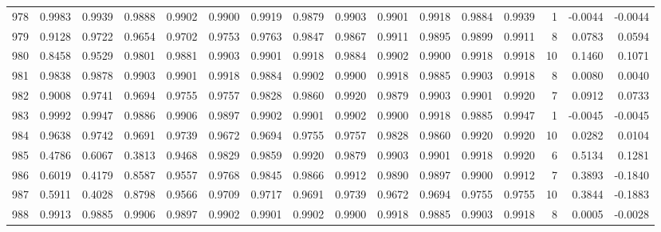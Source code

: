 \begin{tabular}{lrrrrrrrrrrrrrrr}
978 &      0.9983 &  0.9939 &  0.9888 &  0.9902 &  0.9900 &  0.9919 &  0.9879 &  0.9903 &  0.9901 &  0.9918 &   0.9884 &     0.9939 &      1 &                   -0.0044 &                    -0.0044 \\
979 &      0.9128 &  0.9722 &  0.9654 &  0.9702 &  0.9753 &  0.9763 &  0.9847 &  0.9867 &  0.9911 &  0.9895 &   0.9899 &     0.9911 &      8 &                    0.0783 &                     0.0594 \\
980 &      0.8458 &  0.9529 &  0.9801 &  0.9881 &  0.9903 &  0.9901 &  0.9918 &  0.9884 &  0.9902 &  0.9900 &   0.9918 &     0.9918 &     10 &                    0.1460 &                     0.1071 \\
981 &      0.9838 &  0.9878 &  0.9903 &  0.9901 &  0.9918 &  0.9884 &  0.9902 &  0.9900 &  0.9918 &  0.9885 &   0.9903 &     0.9918 &      8 &                    0.0080 &                     0.0040 \\
982 &      0.9008 &  0.9741 &  0.9694 &  0.9755 &  0.9757 &  0.9828 &  0.9860 &  0.9920 &  0.9879 &  0.9903 &   0.9901 &     0.9920 &      7 &                    0.0912 &                     0.0733 \\
983 &      0.9992 &  0.9947 &  0.9886 &  0.9906 &  0.9897 &  0.9902 &  0.9901 &  0.9902 &  0.9900 &  0.9918 &   0.9885 &     0.9947 &      1 &                   -0.0045 &                    -0.0045 \\
984 &      0.9638 &  0.9742 &  0.9691 &  0.9739 &  0.9672 &  0.9694 &  0.9755 &  0.9757 &  0.9828 &  0.9860 &   0.9920 &     0.9920 &     10 &                    0.0282 &                     0.0104 \\
985 &      0.4786 &  0.6067 &  0.3813 &  0.9468 &  0.9829 &  0.9859 &  0.9920 &  0.9879 &  0.9903 &  0.9901 &   0.9918 &     0.9920 &      6 &                    0.5134 &                     0.1281 \\
986 &      0.6019 &  0.4179 &  0.8587 &  0.9557 &  0.9768 &  0.9845 &  0.9866 &  0.9912 &  0.9890 &  0.9897 &   0.9900 &     0.9912 &      7 &                    0.3893 &                    -0.1840 \\
987 &      0.5911 &  0.4028 &  0.8798 &  0.9566 &  0.9709 &  0.9717 &  0.9691 &  0.9739 &  0.9672 &  0.9694 &   0.9755 &     0.9755 &     10 &                    0.3844 &                    -0.1883 \\
988 &      0.9913 &  0.9885 &  0.9906 &  0.9897 &  0.9902 &  0.9901 &  0.9902 &  0.9900 &  0.9918 &  0.9885 &   0.9903 &     0.9918 &      8 &                    0.0005 &                    -0.0028 \\

\end{tabular}
